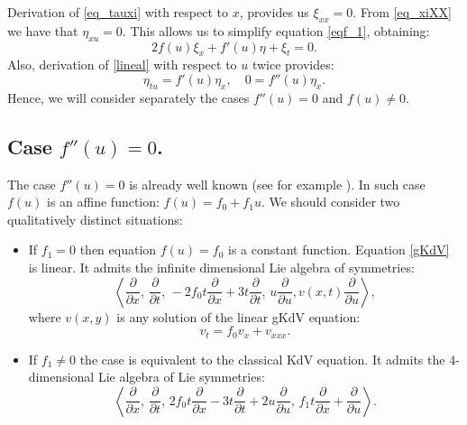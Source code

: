 \documentclass[
11pt,%
tightenlines,%
twoside,%
onecolumn,%
nofloats,%
nobibnotes,%
nofootinbib,%
superscriptaddress,%
noshowpacs,%
centertags]%
{revtex4}
\begin{document}
Derivation of \eqref{eq_tauxi} with respect to $x$, provides us $\xi_{xx}= 0$. From \eqref{eq_xiXX} we have that $\eta_{xu}=0$. This allows us to simplify equation \eqref{eqf_1}, obtaining:
\begin{equation}
2f(u)\xi_x + f'(u)\eta + \xi_t = 0. \label{eqf_2} \tag{8'}
\end{equation}
Also, derivation of \eqref{lineal} with respect to $u$ twice provides:
\begin{equation}\label{eq_eta}
\eta_{tu} = f'(u)\eta_x, \quad 0 = f''(u)\eta_x.
\end{equation}
Hence, we will consider separately the cases $f''(u)=0$ and $f(u)\neq 0$.

\subsection{Case $f''(u) = 0$.}

The case $f''(u) = 0$ is already well known (see for example  \cite{Drazin1989}). In such case $f(u)$ is an affine function:
$f(u) = f_0 + f_1u.$
We should consider two qualitatively distinct situations:
\begin{itemize}
\item If $f_1 = 0$ then equation $f(u) = f_0$ is a constant function. Equation \eqref{gKdV} is linear. It admits the infinite dimensional Lie algebra of symmetries:
\begin{equation}
\left\langle\frac{\partial}{\partial x},\, \frac{\partial}{\partial t},\,
-2f_0 t\frac{\partial}{\partial x} + 3t\frac{\partial}{\partial t},\, 
u\frac{\partial}{\partial u}, v(x,t) \frac{\partial}{\partial u}\right\rangle,
\end{equation}
where $v(x,y)$ is any solution of the linear gKdV equation:
\begin{equation}
v_t = f_0v_x + v_{xxx}.
\end{equation}

\item If $f_1 \neq 0 $ the case is equivalent to the classical KdV equation. It admits the $4$-dimensional Lie algebra of Lie symmetries:
\begin{equation}
\left\langle\frac{\partial}{\partial x},\, \frac{\partial}{\partial t},\,
2f_0 t\frac{\partial}{\partial x} - 3t\frac{\partial}{\partial t} + 2u \frac{\partial}{\partial u},\, 
f_1t\frac{\partial}{\partial x} + \frac{\partial}{\partial u}\right\rangle.
\end{equation}
\end{itemize}
\end{document}
